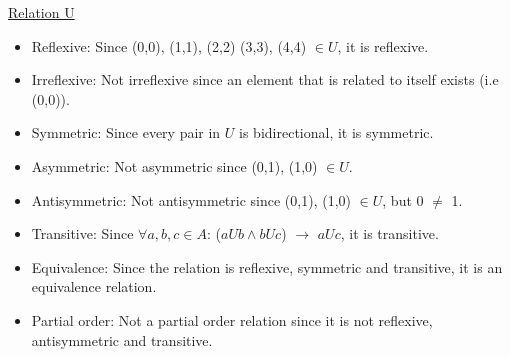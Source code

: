 \underline{Relation U}
\begin{itemize}
    \item Reflexive: Since (0,0), (1,1), (2,2) (3,3), (4,4) $\in U$, it is reflexive.
    \item Irreflexive: Not irreflexive since an element that is related to itself exists (i.e (0,0)).
    \item Symmetric: Since every pair in $U$ is bidirectional, it is symmetric.
    \item Asymmetric: Not asymmetric since (0,1), (1,0) $\in U$.
    \item Antisymmetric: Not antisymmetric since (0,1), (1,0) $\in U$, but 0 $\neq$ 1.
    \item Transitive: Since $\forall a,b,c \in A$: ($aUb \wedge bUc$) $\rightarrow$ $aUc$, it is transitive.
    \item Equivalence: Since the relation is reflexive, symmetric and transitive, it is an equivalence relation.
    \item Partial order: Not a partial order relation since it is not reflexive, antisymmetric and transitive.
\end{itemize}
